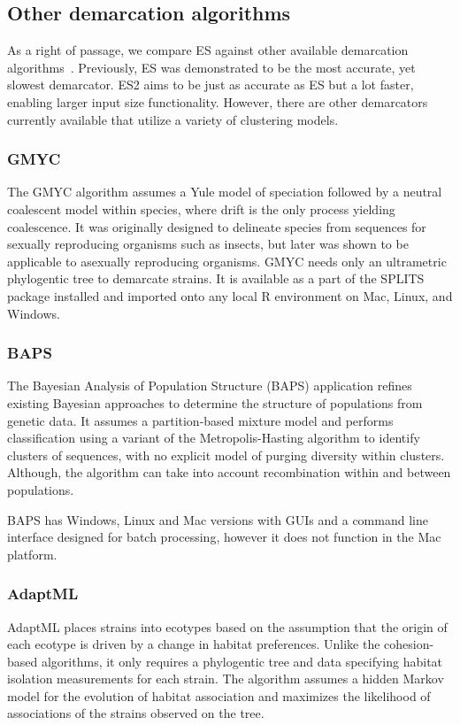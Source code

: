 \subsection*{Other demarcation algorithms}
As a right of passage, we compare ES against other available demarcation algorithms~\cite{carlo}.
Previously, ES was demonstrated to be the most accurate, yet slowest demarcator.
ES2 aims to be just as accurate as ES but a lot faster, enabling larger input size functionality.
However, there are other demarcators currently available that utilize a variety of clustering models.

\subsubsection*{GMYC~\cite{barraclough2009inferring}}
The GMYC algorithm assumes a Yule model of speciation followed by a neutral coalescent model within species, where drift is the only process yielding coalescence.
It was originally designed to delineate species from sequences for sexually reproducing organisms such as insects, but later was shown to be applicable to asexually reproducing organisms.
GMYC needs only an ultrametric phylogentic tree to demarcate strains.
It is available as a part of the SPLITS package installed and imported onto any local R environment on Mac, Linux, and Windows.

\subsubsection*{BAPS~\cite{corander2007bayesian}}
The Bayesian Analysis of Population Structure (BAPS) application refines existing Bayesian approaches to determine the structure of populations from genetic data.
It assumes a partition-based mixture model and performs classification using a variant of the Metropolis-Hasting algorithm to identify clusters of sequences, with no explicit model of purging diversity within clusters.
Although, the algorithm can take into account recombination within and between populations.

BAPS has Windows, Linux and Mac versions with GUIs and a command line interface designed for batch processing, however it does not function in the Mac platform.

\subsubsection*{AdaptML~\cite{hunt2008resource}}
AdaptML places strains into ecotypes based on the assumption that the origin of each ecotype is driven by a change in habitat preferences.
Unlike the cohesion-based algorithms, it only requires a phylogentic tree and data specifying habitat isolation measurements for each strain.
The algorithm assumes a hidden Markov model for the evolution of habitat association and maximizes the likelihood of associations of the strains observed on the tree.

